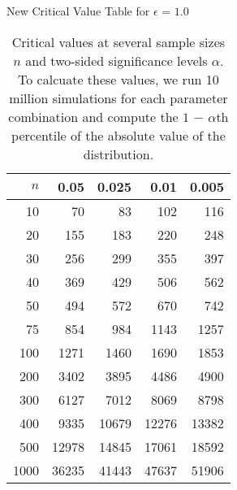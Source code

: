 \begin{table}[ht]
\centering
\caption{New Critical Value Table for $\epsilon$ = $1.0$}
\label{tab:crit_val_eps_1.0}
\begin{tabular}{rrrrr}
  \hline
$n$ & 0.05 & 0.025 & 0.01 & 0.005 \\ 
  \hline
10 & 70 & 83 & 102 & 116 \\ 
  20 & 155 & 183 & 220 & 248 \\ 
  30 & 256 & 299 & 355 & 397 \\ 
  40 & 369 & 429 & 506 & 562 \\ 
  50 & 494 & 572 & 670 & 742 \\ 
  75 & 854 & 984 & 1143 & 1257 \\ 
  100 & 1271 & 1460 & 1690 & 1853 \\ 
  200 & 3402 & 3895 & 4486 & 4900 \\ 
  300 & 6127 & 7012 & 8069 & 8798 \\ 
  400 & 9335 & 10679 & 12276 & 13382 \\ 
  500 & 12978 & 14845 & 17061 & 18592 \\ 
  1000 & 36235 & 41443 & 47637 & 51906 \\ 
   \hline
\end{tabular}
\\[10pt]
\caption*{Critical values at several sample sizes $n$ and two-sided significance levels $\alpha$. To calcuate these values, we run 10 million simulations for each parameter combination and compute the $1$ $-$ $\alpha$th percentile of the absolute value of the distribution.}
\end{table}

